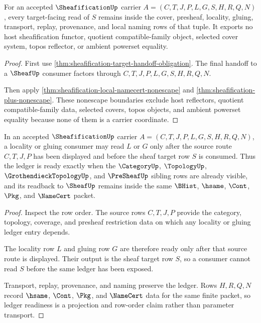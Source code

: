 \begin{theorem}
\label{thm:sheafification-target-nonescape-ledger}
For an accepted $\SheafificationUp$ carrier $A=(C,T,J,P,L,G,S,H,R,Q,N)$, every target-facing read of $S$ remains inside the cover, presheaf, locality, gluing, transport, replay, provenance, and local naming rows of that tuple. It exports no host sheafification functor, quotient compatible-family object, selected cover system, topos reflector, or ambient powerset equality.
\end{theorem}
\begin{proof}
First use \autoref{thm:sheafification-target-handoff-obligation}. The final handoff to a $\SheafUp$ consumer factors through $C,T,J,P,L,G,S,H,R,Q,N$.

Then apply \autoref{thm:sheafification-local-namecert-nonescape} and \autoref{thm:sheafification-plus-nonescape}. These nonescape boundaries exclude host reflectors, quotient compatible-family data, selected covers, topos objects, and ambient powerset equality because none of them is a carrier coordinate.
\end{proof}

\begin{theorem}
\label{thm:sheafification-locality-gluing-ledger-readiness}
In an accepted $\SheafificationUp$ carrier $A=(C,T,J,P,L,G,S,H,R,Q,N)$, a locality or gluing consumer may read $L$ or $G$ only after the source route $C,T,J,P$ has been displayed and before the sheaf target row $S$ is consumed. Thus the ledger is ready exactly when the $\CategoryUp$, $\TopologyUp$, $\GrothendieckTopologyUp$, and $\PreSheafUp$ sibling rows are already visible, and its readback to $\SheafUp$ remains inside the same $\BHist$, $\hsame$, $\Cont$, $\Pkg$, and $\NameCert$ packet.
\end{theorem}
\begin{proof}
Inspect the row order. The source rows $C,T,J,P$ provide the category, topology, coverage, and presheaf restriction data on which any locality or gluing ledger entry depends.

The locality row $L$ and gluing row $G$ are therefore ready only after that source route is displayed. Their output is the sheaf target row $S$, so a consumer cannot read $S$ before the same ledger has been exposed.

Transport, replay, provenance, and naming preserve the ledger. Rows $H,R,Q,N$ record $\hsame$, $\Cont$, $\Pkg$, and $\NameCert$ data for the same finite packet, so ledger readiness is a projection and row-order claim rather than parameter transport.
\end{proof}

